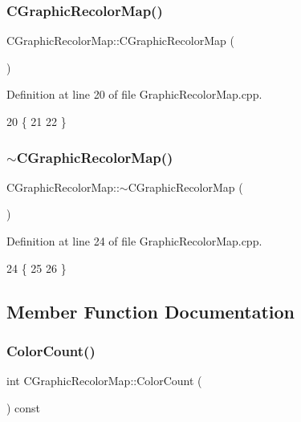 \subsubsection{\texorpdfstring{C\+Graphic\+Recolor\+Map()}{CGraphicRecolorMap()}}
{\footnotesize\ttfamily C\+Graphic\+Recolor\+Map\+::\+C\+Graphic\+Recolor\+Map (\begin{DoxyParamCaption}{ }\end{DoxyParamCaption})}



Definition at line 20 of file Graphic\+Recolor\+Map.\+cpp.


\begin{DoxyCode}
20                                       \{
21     
22 \}
\end{DoxyCode}
\hypertarget{classCGraphicRecolorMap_a74252a2b353bb46a757319c43a61ccfb}{}\label{classCGraphicRecolorMap_a74252a2b353bb46a757319c43a61ccfb} 
\subsubsection{\texorpdfstring{$\sim$\+C\+Graphic\+Recolor\+Map()}{~CGraphicRecolorMap()}}
{\footnotesize\ttfamily C\+Graphic\+Recolor\+Map\+::$\sim$\+C\+Graphic\+Recolor\+Map (\begin{DoxyParamCaption}{ }\end{DoxyParamCaption})}



Definition at line 24 of file Graphic\+Recolor\+Map.\+cpp.


\begin{DoxyCode}
24                                        \{
25     
26 \}
\end{DoxyCode}


\subsection{Member Function Documentation}
\hypertarget{classCGraphicRecolorMap_a62215bd2082304dc710d0f63af9c9906}{}\label{classCGraphicRecolorMap_a62215bd2082304dc710d0f63af9c9906} 
\subsubsection{\texorpdfstring{Color\+Count()}{ColorCount()}}
{\footnotesize\ttfamily int C\+Graphic\+Recolor\+Map\+::\+Color\+Count (\begin{DoxyParamCaption}{ }\end{DoxyParamCaption}) const\hspace{0.3cm}{\ttfamily [inline]}}



